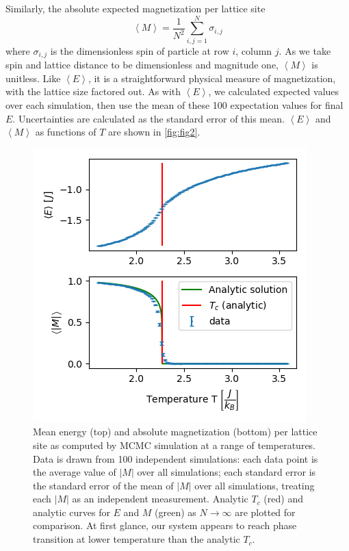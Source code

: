 \documentclass[letter,scriptaddress,twocolumn, prl,nofootinbib]{revtex4}
\newcommand{\submin}[1]{\left\langle #1 \right\rangle}
\begin{document}
Similarly, the absolute expected magnetization per lattice site
\begin{equation}
	\label{eq:m_average}
	\submin{M} = \frac{1}{N^2}\sum_{i, j = 1}^{N} \sigma_{i, j}
\end{equation}
where $\sigma_{i, j}$ is the dimensionless spin of particle at row $i$, column $j$. As we take spin and lattice distance to be dimensionless and magnitude one, $\submin{M}$ is unitless. Like $\submin{E}$, it is a straightforward physical measure of magnetization, with the lattice size factored out. As with $\submin{E}$, we calculated expected values over each simulation, then use the mean of these 100 expectation values for final $E$. Uncertainties are calculated as the standard error of this mean. $\submin{E}$ and $\submin{M}$ as functions of $T$ are shown in \autoref{fig:fig2}.

\begin{figure}[h]
	\begin{center}
		\includegraphics[width=.5\textwidth]{figs/fig2_EMplots.png}
		\caption{Mean energy (top) and absolute magnetization (bottom) per lattice site as computed by MCMC simulation at a range of temperatures. Data is drawn from 100 independent simulations: each data point is the average value of $|M|$ over all simulations; each standard error is the standard error of the mean of $|M|$ over all simulations, treating each $|M|$ as an independent measurement. Analytic $T_c$ (red) and analytic curves for $E$ and $M$ (green) as $N\rightarrow\infty$ are plotted for comparison. At first glance, our system appears to reach phase transition at lower temperature than the analytic $T_c$.}
		\label{fig:fig2}
	\end{center}
\end{figure}
\end{document}
